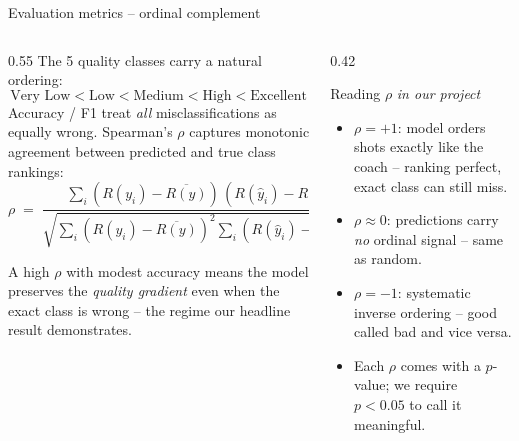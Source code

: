 \begin{frame}{Evaluation metrics -- ordinal complement}
\begin{columns}[T,onlytextwidth]
\begin{column}{0.55\textwidth}
\small
The 5 quality classes carry a \alert{natural ordering}:
\[
\text{Very Low}\!<\!\text{Low}\!<\!\text{Medium}\!<\!\text{High}\!<\!\text{Excellent}
\]
Accuracy / F1 treat \emph{all} misclassifications as equally wrong. \alert{Spearman's $\rho$} captures monotonic agreement between predicted and true class rankings:
\[
\rho \;=\; \frac{\sum_i (R(y_i)\!-\!\overline{R(y)})\,(R(\hat{y}_i)\!-\!\overline{R(\hat{y})})}{\sqrt{\sum_i(R(y_i)\!-\!\overline{R(y)})^2 \sum_i(R(\hat{y}_i)\!-\!\overline{R(\hat{y})})^2}}
\]
\vspace{-4pt}
\begin{noteBox}\scriptsize
A high $\rho$ with modest accuracy means the model preserves the \emph{quality gradient} even when the exact class is wrong -- the regime our headline result demonstrates.
\end{noteBox}
\end{column}
\begin{column}{0.42\textwidth}
\begin{exampleblock}{Reading $\rho$ \emph{in our project}}
\scriptsize
\begin{itemize}\itemsep1pt
    \item \alert{$\rho = +1$:} model orders shots exactly like the coach -- ranking perfect, exact class can still miss.
    \item \alert{$\rho \approx 0$:} predictions carry \emph{no} ordinal signal -- same as random.
    \item \alert{$\rho = -1$:} systematic inverse ordering -- good called bad and vice versa.
    \item Each $\rho$ comes with a $p$-value; we require \alert{$p\!<\!0.05$} to call it meaningful.
\end{itemize}
\end{exampleblock}
\end{column}
\end{columns}
\end{frame}
